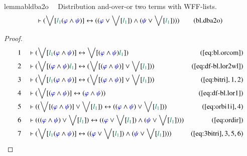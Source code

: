 \begin{restatable}{lemma}{bldba2o}~~ Distribution and-over-or two terms with
WFF-lists.
\begin{align}
\vdash ( \bigvee[ \mwl{l_1} ( \mw{\varphi} \wedge \mw{\psi} ) ] \leftrightarrow
    ( ( \mw{\varphi} \vee \bigvee[ \mwl{l_1} ] ) \wedge ( \mw{\psi} \vee
    \bigvee[ \mwl{l_1} ] ) ) )\label{eq:bl.dba2o}\tag{bl.dba2o}
\end{align}
\end{restatable}

\begin{proof}
\begin{align}
  1 &&  & \vdash ( \bigvee[ \mwl{l_1} ( \mw{\varphi} \wedge \mw{\psi} ) ]
      \leftrightarrow \bigvee[ ( \mw{\varphi} \wedge
      \mw{\psi} ) \mwl{l_1} ]
      )&(\mbox{\ref{eq:bl.orcom}})\notag
  \\ 2 &&  & \vdash ( \bigvee[ ( \mw{\varphi} \wedge \mw{\psi} ) \mwl{l_1} ]
      \leftrightarrow ( \bigvee[ ( \mw{\varphi} \wedge
      \mw{\psi} ) ] \vee \bigvee[ \mwl{l_1} ] )
      )&(\mbox{\ref{eq:df-bl.lor2wl}})\notag
  \\ 3 &&  & \vdash ( \bigvee[ \mwl{l_1} ( \mw{\varphi} \wedge \mw{\psi} ) ]
      \leftrightarrow ( \bigvee[ ( \mw{\varphi} \wedge
      \mw{\psi} ) ] \vee \bigvee[ \mwl{l_1} ] )
      )&(\mbox{\ref{eq:bitri}},1,2)\notag
  \\ 4 &&  & \vdash ( \bigvee[ ( \mw{\varphi} \wedge \mw{\psi} ) ]
      \leftrightarrow ( \mw{\varphi} \wedge \mw{\psi} )
      )&(\mbox{\ref{eq:df-bl.lor1}})\notag
  \\ 5 &&  & \vdash ( ( \bigvee[ ( \mw{\varphi} \wedge \mw{\psi} ) ] \vee
      \bigvee[ \mwl{l_1} ] ) \leftrightarrow ( (
      \mw{\varphi} \wedge \mw{\psi} ) \vee \bigvee[
      \mwl{l_1} ] ) )&(\mbox{\ref{eq:orbi1i}},4)\notag
  \\ 6 &&  & \vdash ( ( ( \mw{\varphi} \wedge \mw{\psi} ) \vee \bigvee[
      \mwl{l_1} ] ) \leftrightarrow ( ( \mw{\varphi} \vee
      \bigvee[ \mwl{l_1} ] ) \wedge ( \mw{\psi} \vee
      \bigvee[ \mwl{l_1} ] ) )
      )&(\mbox{\ref{eq:ordir}})\notag
  \\ 7 &&  & \vdash ( \bigvee[ \mwl{l_1} ( \mw{\varphi} \wedge \mw{\psi} ) ]
      \leftrightarrow ( ( \mw{\varphi} \vee \bigvee[
      \mwl{l_1} ] ) \wedge ( \mw{\psi} \vee \bigvee[
      \mwl{l_1} ] ) )
      )&(\mbox{\ref{eq:3bitri}},3,5,6)\notag
\end{align}
\end{proof}


